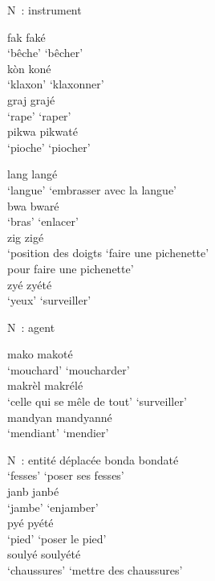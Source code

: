\documentclass[output=paper]{langsci/langscibook}
\begin{document}
\ea \label{ex:VilloingDeglas:26} N~: instrument

  \ea\label{ex:VilloingDeglas:26a}
  \ea \gll fak \textrightarrow{~} faké\\
  {`bêche'} {} {`bêcher'}\\
  \ex \gll kòn \textrightarrow{~} koné\\
  {`klaxon'} {} {`klaxonner'}\\
  \ex \gll graj \textrightarrow{~} grajé\\
  {`rape'} {} {`raper'}\\
  \ex \gll pikwa \textrightarrow{~} pikwaté\\
  {`pioche'} {} {`piocher'}\\
  \z

  \ex\label{ex:VilloingDeglas:26b}
  \ea \gll lang \textrightarrow{~} langé\\
  {`langue'} {} {`embrasser avec la langue'}\\
  \ex \gll bwa \textrightarrow{~} bwaré\\
  {`bras'} {} {`enlacer'}\\
  \ex \glll zig \textrightarrow{~} zigé\\
  {`position des doigts} {} {`faire une
  pichenette'}\\
  {pour faire une pichenette'} {} {}\\
  \ex \gll zyé \textrightarrow{~} zyété\\
  {`yeux'} {} {`surveiller'}\\
  \z\z

\ex \label{ex:VilloingDeglas:27} N~: agent

  \ea \gll mako \textrightarrow{~} makoté\\
  {`mouchard'} {} {`moucharder'}\\
  \ex \gll makrèl \textrightarrow{~} makrélé\\
  {`celle qui se mêle de tout'} {} {`surveiller'}\\
  \ex \gll mandyan \textrightarrow{~} mandyanné\\
  {`mendiant'} {} {`mendier'}\\
  \z

\newpage 
\ex \label{ex:VilloingDeglas:28}

  \ea\label{ex:VilloingDeglas:28a} N~: entité déplacée
  \ea \gll bonda \textrightarrow{~} bondaté\\
  {`fesses'} {} {`poser ses fesses'}\\
  \ex \gll janb \textrightarrow{~} janbé\\
  {`jambe'} {} {`enjamber'}\\
  \ex \gll pyé \textrightarrow{~} pyété\\
  {`pied'} {} {`poser le pied'}\\
  \ex \gll soulyé \textrightarrow{~} soulyété\\
  {`chaussures'} {} {`mettre des chaussures'}\\
  \z\z
\end{document}
